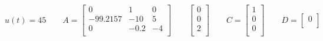 \documentclass{article}
\begin{document}
\begin{enumerate}[a)]
$$
u(t) = 45
\qquad
A
=
\begin{bmatrix}
0 & 1 & 0 \\
-99.2157 & -10 & 5 \\
0 & -0.2 & -4 \\
\end{bmatrix}
\qquad
\begin{bmatrix}
0 \\
0 \\
2 \\
\end{bmatrix}
\qquad
C =
\begin{bmatrix}
1 \\
0 \\
0 \\
\end{bmatrix}
\qquad
D =
\begin{bmatrix}
0 \\
\end{bmatrix}
$$


\end{enumerate}
\end{document}
